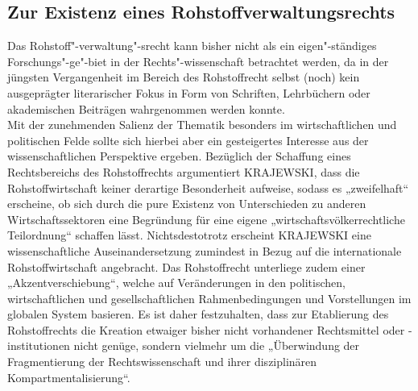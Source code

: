 \documentclass[12pt,a4paper,oneside]{book} %
\begin{document}
\subsection{Zur Existenz eines Rohstoffverwaltungsrechts}
Das Rohstoff"-verwaltung"-srecht kann bisher nicht als ein eigen"-ständiges Forschungs"-ge"-biet in der Rechts"-wissenschaft betrachtet werden, da in der jüngsten Vergangenheit im Bereich des Rohstoffrecht selbst (noch) kein ausgeprägter literarischer Fokus in Form von Schriften, Lehrbüchern oder akademischen Beiträgen wahrgenommen werden konnte.\autocites{feichtner_besonderheit_2016}{schladebach_zur_2017}
\autocite{terhechte_konsolidierung_2015}
\autocite{terhechte_falle_2012}
\\
Mit der zunehmenden Salienz der Thematik besonders im wirtschaftlichen und politischen Felde sollte sich hierbei aber ein gesteigertes Interesse aus der wissenschaftlichen Perspektive ergeben.
Bezüglich der Schaffung eines Rechtsbereichs des Rohstoffrechts argumentiert KRAJEWSKI, dass die Rohstoffwirtschaft keiner derartige Besonderheit aufweise, sodass es „zweifelhaft“ erscheine, ob sich durch die pure Existenz von Unterschieden zu anderen Wirtschaftssektoren eine Begründung für eine eigene „wirtschaftsvölkerrechtliche Teilordnung“ schaffen lässt.\autocite{krajewski_menschenrechte_2016} Nichtsdestotrotz erscheint KRAJEWSKI eine wissenschaftliche Auseinandersetzung zumindest in Bezug auf die internationale Rohstoffwirtschaft angebracht.\autocite{krajewski_menschenrechte_2016} Das Rohstoffrecht unterliege zudem einer „Akzentverschiebung“, welche auf Veränderungen in den politischen, wirtschaftlichen und gesellschaftlichen Rahmenbedingungen und Vorstellungen im globalen System basieren.\autocite{nowrot_menschenrechtliche_2022} Es ist daher festzuhalten, dass zur Etablierung des Rohstoffrechts die Kreation etwaiger bisher nicht vorhandener Rechtsmittel oder -institutionen nicht genüge, sondern vielmehr um die „Überwindung der Fragmentierung der Rechtswissenschaft und ihrer disziplinären Kompartmentalisierung“.\autocite{feichtner_besonderheit_2016}
\end{document}
